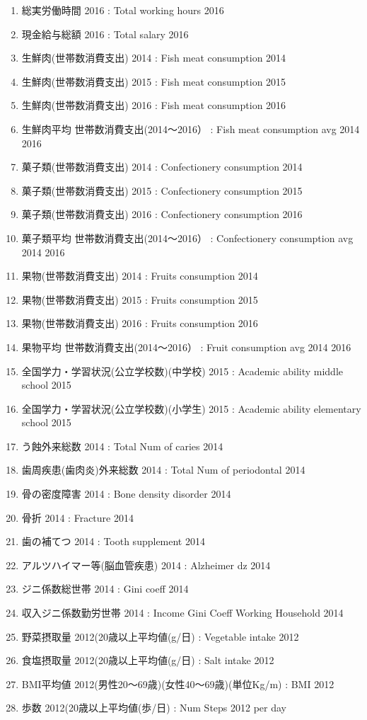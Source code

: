 \begin{enumerate}
  \item 総実労働時間 2016  :  Total working hours 2016
  \item 現金給与総額 2016  :  Total salary 2016
  \item 生鮮肉(世帯数消費支出) 2014  :  Fish meat consumption 2014
  \item 生鮮肉(世帯数消費支出) 2015  :  Fish meat consumption 2015
  \item 生鮮肉(世帯数消費支出) 2016  :  Fish meat consumption 2016
  \item 生鮮肉平均 世帯数消費支出(2014〜2016）  :  Fish meat consumption avg 2014 2016
  \item 菓子類(世帯数消費支出) 2014  :  Confectionery consumption 2014
  \item 菓子類(世帯数消費支出) 2015  :  Confectionery consumption 2015
  \item 菓子類(世帯数消費支出) 2016  :  Confectionery consumption 2016
  \item 菓子類平均 世帯数消費支出(2014〜2016）  :  Confectionery consumption avg 2014 2016
  \item 果物(世帯数消費支出) 2014  :  Fruits consumption 2014
  \item 果物(世帯数消費支出) 2015  :  Fruits consumption 2015
  \item 果物(世帯数消費支出) 2016  :  Fruits consumption 2016
  \item 果物平均 世帯数消費支出(2014〜2016）  :  Fruit consumption avg 2014 2016
  \item 全国学力・学習状況(公立学校数)(中学校) 2015  :  Academic ability middle school 2015
  \item 全国学力・学習状況(公立学校数)(小学生) 2015  :  Academic ability elementary school 2015
  \item う蝕外来総数 2014  :  Total Num of caries 2014
  \item 歯周疾患(歯肉炎)外来総数 2014  :  Total Num of periodontal 2014
  \item 骨の密度障害 2014  :  Bone density disorder 2014
  \item 骨折 2014  :  Fracture 2014
  \item 歯の補てつ 2014  :  Tooth supplement 2014
  \item アルツハイマー等(脳血管疾患) 2014  :  Alzheimer dz 2014
  \item ジニ係数総世帯 2014  :  Gini coeff 2014
  \item 収入ジニ係数勤労世帯 2014  :  Income Gini Coeff Working Household 2014
  \item 野菜摂取量 2012(20歳以上平均値(g/日)  :  Vegetable intake 2012
  \item 食塩摂取量 2012(20歳以上平均値(g/日)  :  Salt intake 2012
  \item BMI平均値 2012(男性20〜69歳)(女性40〜69歳)(単位Kg/m)  :  BMI 2012
  \item 歩数 2012(20歳以上平均値(歩/日)  :  Num Steps 2012 per day
\end{enumerate}



